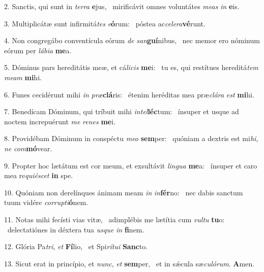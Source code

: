 2. Sanctis, qui sunt in \textit{ter}\textit{ra} \textbf{e}jus, \ast\  mirificávit omnes voluntátes \textit{me}\textit{as} \textit{in} \textbf{e}is.\

3. Multiplicátæ sunt infirmitá\textit{tes} \textit{e}\textbf{ó}rum: \ast\  póstea ac\textit{ce}\textit{le}\textit{ra}\textbf{vé}runt.\

4. Non congregábo conventícula eórum \textit{de} \textit{san}\textbf{guí}nibus, \ast\  nec memor ero nóminum eórum per \textit{lá}\textit{bi}\textit{a} \textbf{me}a.\

5. Dóminus pars hereditátis meæ, et cá\textit{li}\textit{cis} \textbf{me}i: \ast\  tu es, qui restítues hereditá\textit{tem} \textit{me}\textit{am} \textbf{mi}hi.\

6. Funes cecidérunt mihi \textit{in} \textit{præ}\textbf{clá}ris: \ast\  étenim heréditas mea præ\textit{clá}\textit{ra} \textit{est} \textbf{mi}hi.\

7. Benedícam Dóminum, qui tríbuit mihi \textit{in}\textit{tel}\textbf{léc}tum: \ast\  ínsuper et usque ad noctem increpuérunt \textit{me} \textit{re}\textit{nes} \textbf{me}i.\

8. Providébam Dóminum in conspéctu \textit{me}\textit{o} \textbf{sem}per: \ast\  quóniam a dextris est mi\textit{hi}, \textit{ne} \textit{com}\textbf{mó}vear.\

9. Propter hoc lætátum est cor meum, et exsultávit \textit{lin}\textit{gua} \textbf{me}a: \ast\  ínsuper et caro mea re\textit{qui}\textit{é}\textit{scet} \textbf{in} spe.\

10. Quóniam non derelínques ánimam meam \textit{in} \textit{in}\textbf{fér}no: \ast\  nec dabis sanctum tuum vidére \textit{cor}\textit{rup}\textit{ti}\textbf{ó}nem.\

11. Notas mihi fecísti vias vitæ, \dag\  adimplébis me lætítia cum \textit{vul}\textit{tu} \textbf{tu}o: \ast\  delectatiónes in déxtera tua \textit{us}\textit{que} \textit{in} \textbf{fi}nem.\

12. Glória Pa\textit{tri}, \textit{et} \textbf{Fí}lio, \ast\  et Spi\textit{rí}\textit{tu}\textit{i} \textbf{Sanc}to.\

13. Sicut erat in princípio, et \textit{nunc}, \textit{et} \textbf{sem}per, \ast\  et in sǽcula sæ\textit{cu}\textit{ló}\textit{rum}. \textbf{A}men.\

